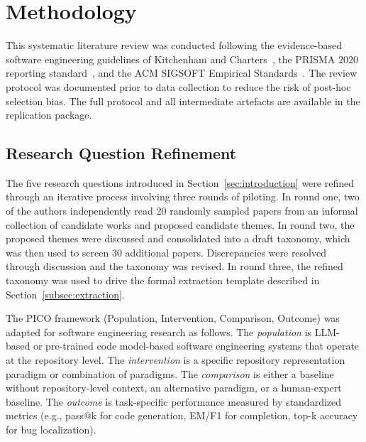 \section{Methodology}
\label{sec:methodology}

This systematic literature review was conducted following the evidence-based software
engineering guidelines of Kitchenham and Charters~\cite{kitchenham2007guidelines}, the
PRISMA 2020 reporting standard~\cite{page2021prisma}, and the ACM SIGSOFT Empirical
Standards~\cite{acm2020empirical}. The review protocol was documented prior to data
collection to reduce the risk of post-hoc selection bias. The full protocol and all
intermediate artefacts are available in the replication package.

\subsection{Research Question Refinement}
\label{subsec:rq-refinement}

The five research questions introduced in Section~\ref{sec:introduction} were refined through
an iterative process involving three rounds of piloting. In round one, two of the authors
independently read 20 randomly sampled papers from an informal collection of candidate works
and proposed candidate themes. In round two, the proposed themes were discussed and consolidated
into a draft taxonomy, which was then used to screen 30 additional papers. Discrepancies were
resolved through discussion and the taxonomy was revised. In round three, the refined taxonomy
was used to drive the formal extraction template described in Section~\ref{subsec:extraction}.

The PICO framework (Population, Intervention, Comparison, Outcome) was adapted for software
engineering research as follows. The \emph{population} is LLM-based or pre-trained code
model-based software engineering systems that operate at the repository level. The
\emph{intervention} is a specific repository representation paradigm or combination of
paradigms. The \emph{comparison} is either a baseline without repository-level context, an
alternative paradigm, or a human-expert baseline. The \emph{outcome} is task-specific
performance measured by standardized metrics (e.g., pass@k for code generation, EM/F1 for
completion, top-k accuracy for bug localization).

